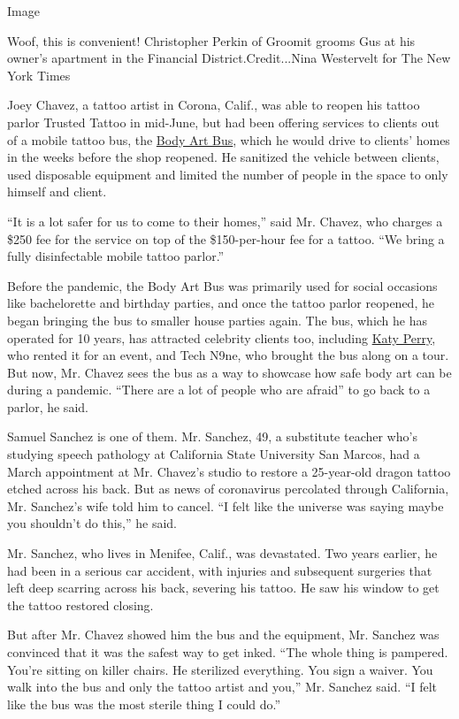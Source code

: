 Image

Woof, this is convenient! Christopher Perkin of Groomit grooms Gus at
his owner's apartment in the Financial District.Credit...Nina Westervelt
for The New York Times

Joey Chavez, a tattoo artist in Corona, Calif., was able to reopen his
tattoo parlor Trusted Tattoo in mid-June, but had been offering services
to clients out of a mobile tattoo bus, the
\href{https://www.bodyartbus.com/}{Body Art Bus}, which he would drive
to clients' homes in the weeks before the shop reopened. He sanitized
the vehicle between clients, used disposable equipment and limited the
number of people in the space to only himself and client.

``It is a lot safer for us to come to their homes,'' said Mr. Chavez,
who charges a \$250 fee for the service on top of the \$150-per-hour fee
for a tattoo. ``We bring a fully disinfectable mobile tattoo parlor.''

Before the pandemic, the Body Art Bus was primarily used for social
occasions like bachelorette and birthday parties, and once the tattoo
parlor reopened, he began bringing the bus to smaller house parties
again. The bus, which he has operated for 10 years, has attracted
celebrity clients too, including
\href{https://twitter.com/BodyArtBus/status/1134131165697257477}{Katy
Perry}, who rented it for an event, and Tech N9ne, who brought the bus
along on a tour. But now, Mr. Chavez sees the bus as a way to showcase
how safe body art can be during a pandemic. ``There are a lot of people
who are afraid'' to go back to a parlor, he said.

Samuel Sanchez is one of them. Mr. Sanchez, 49, a substitute teacher
who's studying speech pathology at California State University San
Marcos, had a March appointment at Mr. Chavez's studio to restore a
25-year-old dragon tattoo etched across his back. But as news of
coronavirus percolated through California, Mr. Sanchez's wife told him
to cancel. ``I felt like the universe was saying maybe you shouldn't do
this,'' he said.

Mr. Sanchez, who lives in Menifee, Calif., was devastated. Two years
earlier, he had been in a serious car accident, with injuries and
subsequent surgeries that left deep scarring across his back, severing
his tattoo. He saw his window to get the tattoo restored closing.

But after Mr. Chavez showed him the bus and the equipment, Mr. Sanchez
was convinced that it was the safest way to get inked. ``The whole thing
is pampered. You're sitting on killer chairs. He sterilized everything.
You sign a waiver. You walk into the bus and only the tattoo artist and
you,'' Mr. Sanchez said. ``I felt like the bus was the most sterile
thing I could do.''

